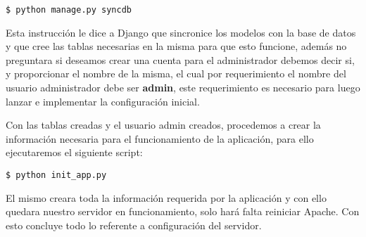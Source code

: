 \begin{lstlisting}[style=consola]
$ python manage.py syncdb
\end{lstlisting}

Esta instrucción le dice a Django que sincronice los modelos con la base de datos y que cree las tablas necesarias en la misma para que esto funcione, además no preguntara si deseamos crear una cuenta para el administrador debemos decir si, y proporcionar el nombre de la misma, el cual por requerimiento el nombre del usuario administrador debe ser \textbf{admin}, este requerimiento es necesario para luego lanzar e implementar la configuración inicial.

Con las tablas creadas y el usuario admin creados, procedemos a crear la información necesaria para el funcionamiento de la aplicación, para ello ejecutaremos el siguiente script:

\begin{lstlisting}[style=consola]
$ python init_app.py
\end{lstlisting}

El mismo creara toda la información requerida por la aplicación y con ello quedara nuestro servidor en funcionamiento, solo hará falta reiniciar Apache. Con esto concluye todo lo referente a configuración del servidor.









